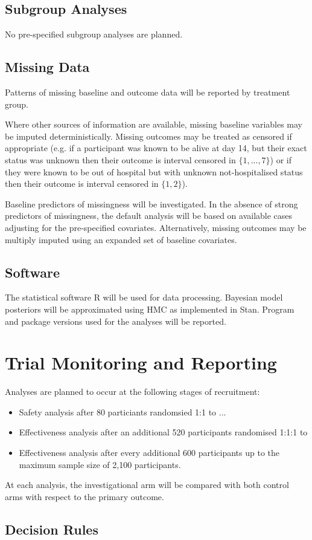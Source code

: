 \documentclass[11pt,parskip=half-]{scrartcl}
\begin{document}
\subsection{Subgroup Analyses}
No pre-specified subgroup analyses are planned.

\subsection{Missing Data}
Patterns of missing baseline and outcome data will be reported by treatment group.

Where other sources of information are available, missing baseline variables may be imputed deterministically. Missing outcomes may be treated as censored if appropriate (e.g. if a participant was known to be alive at day 14, but their exact status was unknown then their outcome is interval censored in $\{1,...,7\}$) or if they were known to be out of hospital but with unknown not-hospitalised status then their outcome is interval censored in $\{1,2\}$).

Baseline predictors of missingness will be investigated. In the absence of strong predictors of missingness, the default analysis will be based on available cases adjusting for the pre-specified covariates. Alternatively, missing outcomes may be multiply imputed using an expanded set of baseline covariates.

\subsection{Software}
The statistical software R will be used for data processing. Bayesian model posteriors will be approximated using HMC as implemented in Stan. Program and package versions used for the analyses will be reported.

\clearpage

\section{Trial Monitoring and Reporting}

Analyses are planned to occur at the following stages of recruitment:

\begin{itemize}
    \item Safety analysis after 80 particiants randomsied 1:1 to ...
    \item Effectiveness analysis after an additional 520 participants randomised 1:1:1 to
    \item Effectiveness analysis after every additional 600 participants up to the maximum sample size of 2,100 participants.
\end{itemize}

At each analysis, the investigational arm will be compared with both control arms with respect to the primary outcome.

\subsection{Decision Rules}
\end{document}
